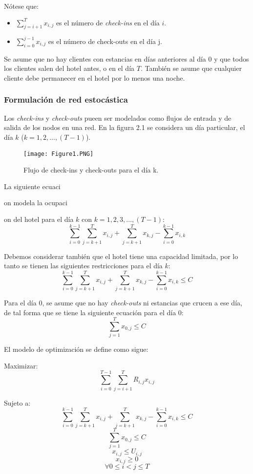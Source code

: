 {{{Nótese que:

\begin{itemize}
  \item $\sum_{j=i+1}^{T} x_{i,j}$ es el número de \emph{check-ins} en el día $i$.
  \item $\sum_{i=0}^{j-1} x_{i,j}$ es el número de check-outs en el día j.
\end{itemize}

Se asume que no hay clientes con estancias en días anteriores al día 0 y que todos los clientes salen del hotel antes, o en el día $T$. También se asume que cualquier cliente debe permanecer en el hotel por lo menos una noche.

\subsubsection*{Formulación de red estocástica}

Los \emph{check-ins} y \emph{check-outs} pueen ser modelados como flujos de entrada y de salida de los nodos en una red. En la figura 2.1 se considera un día particular, el día $k$ ($k={1,2,...,(T-1)}$).

\begin{figure}
  \texttt{[image: Figure1.PNG]}
  \caption{Flujo de check-ins y check-outs para el día k.}
  \label{fig:Figure2.2}
\end{figure}

La siguiente ecuaci{on modela la ocupaci{on del hotel para el día $k$ con $k = 1,2,3,...,(T-1)$:$$\sum_{i=0}^{k-1}\sum_{j=k+1}^{T} x_{i,j} + \sum_{j=k+1}^{T} x_{k,j} - \sum_{i=0}^{k-1} x_{i,k}$$

Debemos considerar también que el hotel tiene una capacidad limitada, por lo tanto se tienen las siguientes restricciones para el día $k$:
$$\sum_{i=0}^{k-1}\sum_{j=k+1}^{T} x_{i,j} + \sum_{j=k+1}^{T} x_{k,j} - \sum_{i=0}^{k-1} x_{i,k} \leq C$$

Para el día 0, se asume que no hay \emph{check-outs} ni estancias que crucen a ese día, de tal forma que se tiene la siguiente ecuación para el día 0: 
$$\sum_{j=1}^{T} x_{0,j} \leq C$$

El modelo de optimización se define como sigue:

Maximizar: $$\sum_{i=0}^{T-1}\sum_{j=i+1}^{T} R_{i,j}x_{i,j}$$

Sujeto a: $$\sum_{i=0}^{k-1}\sum_{j=k+1}^{T} x_{i,j} + \sum_{j=k+1}^{T} x_{k,j} - \sum_{i=0}^{k-1} x_{i,k} \leq C$$
$$\sum_{j=1}^{T} x_{0,j} \leq C$$
$$x_{i,j} \leq U_{i,j}$$
$$x_{i,j} \geq 0$$
$$\forall 0\leq i < j \leq T$$

}}}}}
